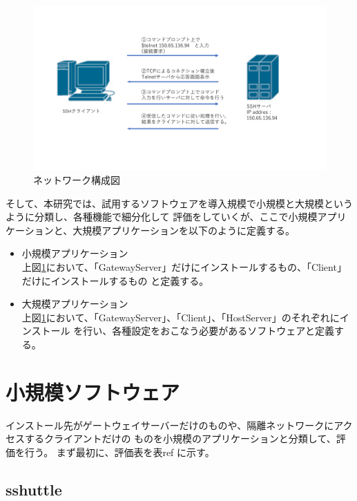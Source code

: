 \documentclass[12pt,a4paper,titlepage]{jsarticle}
\begin{document}
\begin{figure}[H]
    \centering
    \includegraphics*[width=1.0\textwidth,page=2]{graphs/network_archtecture.pdf}
    \caption{ネットワーク構成図}
    \label{network_graph}
\end{figure}



そして、本研究では、試用するソフトウェアを導入規模で小規模と大規模というように分類し、各種機能で細分化して
評価をしていくが、ここで小規模アプリケーションと、大規模アプリケーションを以下のように定義する。
\begin{itemize}
    \item 小規模アプリケーション\mbox{}\\
    上図\ref{network_graph}において、「GatewayServer」だけにインストールするもの、「Client」だけにインストールするもの
    と定義する。
    \item 大規模アプリケーション\mbox{}\\
    上図\ref{network_graph}において、「GatewayServer」、「Client」、「HostServer」のそれぞれにインストール
    を行い、各種設定をおこなう必要があるソフトウェアと定義する。


\end{itemize}


\section{小規模ソフトウェア}
インストール先がゲートウェイサーバーだけのものや、隔離ネットワークにアクセスするクライアントだけの
ものを小規模のアプリケーションと分類して、評価を行う。
まず最初に、評価表を表ref に示す。


\subsection{sshuttle}
\end{document}
